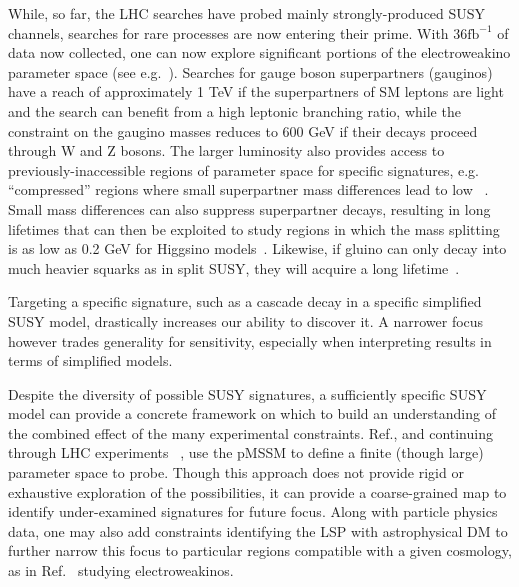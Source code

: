 
While, so far, the LHC searches have probed mainly strongly-produced SUSY channels, searches for rare processes are now entering their prime. With $36 \textrm{fb}^{-1}$ of data now collected, one can now explore significant portions of the electroweakino parameter space (see e.g.~\cite{Sirunyan:2018ubx,ATLAS:2017uun}). %
Searches for gauge boson superpartners (gauginos) have a reach of approximately 1 TeV if the superpartners of SM leptons are light and the search can benefit from a high leptonic branching ratio, while the constraint on the gaugino masses reduces to 600 GeV if their decays proceed through W and Z bosons. 
The larger luminosity also provides access to previously-inaccessible regions of parameter space for specific signatures, e.g. ``compressed'' regions where small superpartner mass differences lead to low \MET~\cite{Aaboud:2017leg,Sirunyan:2017zss}. 
Small mass differences can also suppress superpartner decays, resulting in long lifetimes that can then be exploited to study regions in which the mass splitting is as low as 0.2 GeV for Higgsino models~\cite{ATL-PHYS-PUB-2017-019}. Likewise, if gluino can only decay into much heavier squarks as in split SUSY, they will acquire a long lifetime~\cite{Sirunyan:2018vjp}. 


Targeting a specific signature, such as a cascade decay in a specific simplified SUSY model, drastically increases our ability to discover it. A narrower focus however trades generality for sensitivity, especially when interpreting results in terms of simplified models. 

Despite the diversity of possible SUSY signatures, a sufficiently specific SUSY model can provide a concrete framework on which to build an understanding of the combined effect of the many experimental constraints. Ref.\cite{Conley:2010du}, and continuing through LHC experiments ~\cite{Aad:2015baa, Khachatryan:2016nvf}, use the pMSSM to define a finite (though large) parameter space to probe. Though this approach does not provide rigid or exhaustive exploration of the possibilities, it can provide a coarse-grained map to identify under-examined signatures for future focus. Along with particle physics data, one may also add constraints identifying the LSP with astrophysical DM to further narrow this focus to particular regions compatible with a given cosmology, as in Ref.~\cite{Aaboud:2016wna} studying electroweakinos.

